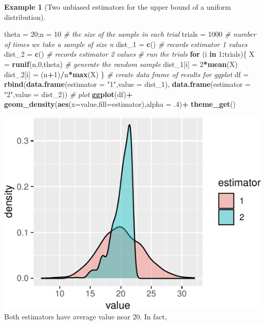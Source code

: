 \documentclass[
]{book}
\newenvironment{Shaded}{\begin{snugshade}}{\end{snugshade}}
\newcommand{\AttributeTok}[1]{\textcolor[rgb]{0.13,0.29,0.53}{#1}}
\newcommand{\CommentTok}[1]{\textcolor[rgb]{0.56,0.35,0.01}{\textit{#1}}}
\newcommand{\ControlFlowTok}[1]{\textcolor[rgb]{0.13,0.29,0.53}{\textbf{#1}}}
\newcommand{\DecValTok}[1]{\textcolor[rgb]{0.00,0.00,0.81}{#1}}
\newcommand{\FunctionTok}[1]{\textcolor[rgb]{0.13,0.29,0.53}{\textbf{#1}}}
\newcommand{\NormalTok}[1]{#1}
\newcommand{\OtherTok}[1]{\textcolor[rgb]{0.56,0.35,0.01}{#1}}
\newcommand{\SpecialCharTok}[1]{\textcolor[rgb]{0.81,0.36,0.00}{\textbf{#1}}}
\newcommand{\StringTok}[1]{\textcolor[rgb]{0.31,0.60,0.02}{#1}}
\theoremstyle{definition}
\theoremstyle{definition}
\newtheorem{example}{Example}[chapter]
\theoremstyle{definition}
\theoremstyle{definition}
\theoremstyle{remark}
\begin{document}
\begin{example}[Two unbiased estimators for the upper bound of a uniform distribution]
\begin{Shaded}
\begin{Highlighting}[]
\NormalTok{theta }\OtherTok{=} \DecValTok{20}\NormalTok{;n }\OtherTok{=} \DecValTok{10} \CommentTok{\# the size of the sample in each trial}
\NormalTok{trials }\OtherTok{=} \DecValTok{1000} \CommentTok{\# number of times we take a sample of size n}
\NormalTok{dist\_1 }\OtherTok{=} \FunctionTok{c}\NormalTok{() }\CommentTok{\# records estimator 1 values}
\NormalTok{dist\_2 }\OtherTok{=} \FunctionTok{c}\NormalTok{() }\CommentTok{\# records estimator 2 values}
\CommentTok{\# run the trials}
\ControlFlowTok{for}\NormalTok{ (i }\ControlFlowTok{in} \DecValTok{1}\SpecialCharTok{:}\NormalTok{trials)\{}
\NormalTok{  X }\OtherTok{=} \FunctionTok{runif}\NormalTok{(n,}\DecValTok{0}\NormalTok{,theta) }\CommentTok{\# generate the random sample}
\NormalTok{  dist\_1[i] }\OtherTok{=} \DecValTok{2}\SpecialCharTok{*}\FunctionTok{mean}\NormalTok{(X)}
\NormalTok{  dist\_2[i] }\OtherTok{=}\NormalTok{ (n}\SpecialCharTok{+}\DecValTok{1}\NormalTok{)}\SpecialCharTok{/}\NormalTok{n}\SpecialCharTok{*}\FunctionTok{max}\NormalTok{(X)}
\NormalTok{\}}
\CommentTok{\# create data frame of results for ggplot}
\NormalTok{df }\OtherTok{=} \FunctionTok{rbind}\NormalTok{(}\FunctionTok{data.frame}\NormalTok{(}\AttributeTok{estimator =} \StringTok{"1"}\NormalTok{,}\AttributeTok{value =}\NormalTok{ dist\_1),}
           \FunctionTok{data.frame}\NormalTok{(}\AttributeTok{estimator =} \StringTok{"2"}\NormalTok{,}\AttributeTok{value =}\NormalTok{ dist\_2))}
\CommentTok{\# plot}
\FunctionTok{ggplot}\NormalTok{(df)}\SpecialCharTok{+}
  \FunctionTok{geom\_density}\NormalTok{(}\FunctionTok{aes}\NormalTok{(}\AttributeTok{x=}\NormalTok{value,}\AttributeTok{fill=}\NormalTok{estimator),}\AttributeTok{alpha =}\NormalTok{ .}\DecValTok{4}\NormalTok{)}\SpecialCharTok{+}
  \FunctionTok{theme\_get}\NormalTok{()}
\end{Highlighting}
\end{Shaded}

\includegraphics{math340-notes_files/figure-latex/unnamed-chunk-36-1.pdf}
Both estimators have average value near 20. In fact,


\end{example}
\end{document}
